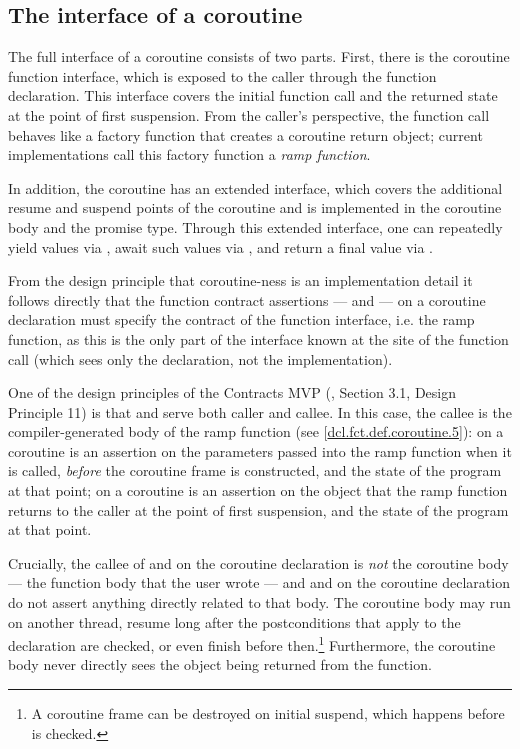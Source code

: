 \subsection{The interface of a coroutine}

The full interface of a coroutine consists of two parts. First, there is the coroutine function interface, which is exposed to the caller through the function declaration. This interface covers the initial function call and the returned state at the point of first suspension. From the caller's perspective, the function call behaves like a factory function that creates a coroutine return object; current implementations call this factory function a \emph{ramp function}.

In addition, the coroutine has an extended interface, which covers the additional resume and suspend points of the coroutine and is implemented in the coroutine body and the promise type.  Through this extended interface, one can repeatedly yield values via , await such values via , and return a final value via .

From the design principle that coroutine-ness is an implementation detail it follows directly that the function contract assertions ---  and  --- on a coroutine declaration must specify the contract of the function interface, i.e. the ramp function, as this is the only part of the interface known at the site of the function call (which sees only the declaration, not the implementation).

One of the design principles of the Contracts MVP (\cite{P2900R8}, Section 3.1, Design Principle 11) is that  and  serve both caller and callee. In this case, the callee is the compiler-generated body of the ramp function (see [\href{https://eel.is/c++draft/dcl.fct.def.coroutine#5}{dcl.fct.def.coroutine.5}]):  on a coroutine is an assertion on the parameters passed into the ramp function when it is called, \emph{before} the coroutine frame is constructed, and the state of the program at that point;  on a coroutine is an assertion on the object that the ramp function returns to the caller at the point of first suspension, and the state of the program at that point.

Crucially, the callee of  and  on the coroutine declaration is \emph{not} the coroutine body --- the function body that the user wrote --- and  and  on the coroutine declaration do not assert anything directly related to that body. The coroutine body may run on another thread, resume long after the postconditions that apply to the declaration are checked, or even finish before then.\footnote{A coroutine frame can be destroyed on initial suspend, which happens before  is checked.} Furthermore, the coroutine body never directly sees the object being returned from the function.


